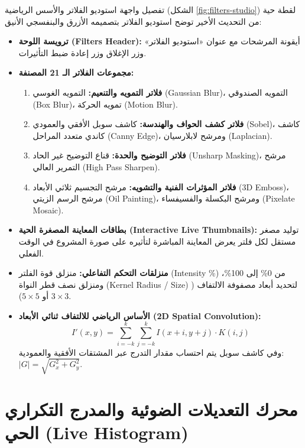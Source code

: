 \documentclass[12pt,a4paper]{report}
\begin{document}
\begin{techbox}{تفصيل واجهة استوديو الفلاتر والأسس الرياضية (الشكل \ref{fig:filters-studio})}
    لقطة حية من التحديث الأخير توضح استوديو الفلاتر بتصميمه الأزرق والبنفسجي الأنيق:
    \begin{itemize}
        \item \textbf{ترويسة اللوحة (Filters Header):} أيقونة المرشحات مع عنوان «استوديو الفلاتر» وزر الإغلاق وزر إعادة ضبط التأثيرات.
        \item \textbf{مجموعات الفلاتر الـ 21 المصنفة:}
        \begin{enumerate}
            \item \textbf{فلاتر التمويه والتنعيم:} التمويه الغوسي (Gaussian Blur)، التمويه الصندوقي (Box Blur)، تمويه الحركة (Motion Blur).
            \item \textbf{فلاتر كشف الحواف والهندسة:} كاشف سوبل الأفقي والعمودي (Sobel)، كاشف كاندي متعدد المراحل (Canny Edge)، ومرشح لابلارسيان (Laplacian).
            \item \textbf{فلاتر التوضيح والحدة:} قناع التوضيح غير الحاد (Unsharp Masking)، مرشح التمرير العالي (High Pass Sharpen).
            \item \textbf{فلاتر المؤثرات الفنية والتشويه:} مرشح التجسيم ثلاثي الأبعاد (3D Emboss)، مرشح الرسم الزيتي (Oil Painting)، ومرشح البكسلة والفسيفساء (Pixelate Mosaic).
        \end{enumerate}
        \item \textbf{بطاقات المعاينة المصغرة الحية (Interactive Live Thumbnails):} توليد مصغر مستقل لكل فلتر يعرض المعاينة المباشرة لتأثيره على صورة المشروع في الوقت الفعلي.
        \item \textbf{منزلقات التحكم التفاعلي:} منزلق قوة الفلتر (Intensity \%) من 0\% إلى 100\%، ومنزلق نصف قطر النواة (Kernel Radius / Size) لتحديد أبعاد مصفوفة الالتفاف ($3 \times 3$ أو $5 \times 5$).
        \item \textbf{الأساس الرياضي للالتفاف ثنائي الأبعاد (2D Spatial Convolution):}
        \begin{equation}
            I'(x, y) = \sum_{i=-k}^{k} \sum_{j=-k}^{k} I(x+i, y+j) \cdot K(i, j)
        \end{equation}
        وفي كاشف سوبل يتم احتساب مقدار التدرج عبر المشتقات الأفقية والعمودية: $|G| = \sqrt{G_x^2 + G_y^2}$.
    \end{itemize}
\end{techbox}

\section{محرك التعديلات الضوئية والمدرج التكراري الحي (Live Histogram)}
\end{document}
